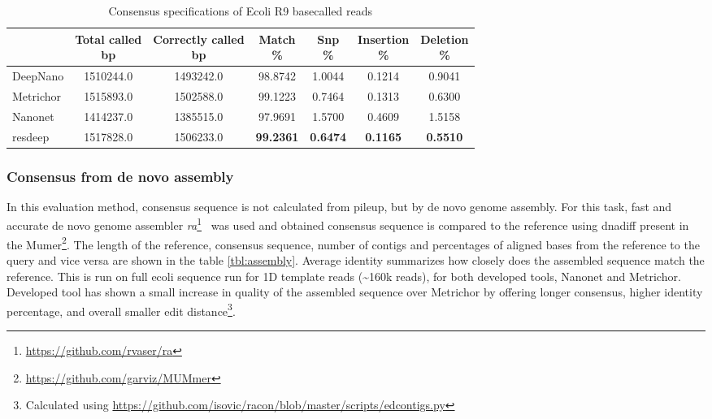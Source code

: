 \documentclass[runningheads,a4paper]{llncs}
\begin{document}
\begin{table}[]
	\caption{Consensus specifications of Ecoli R9 basecalled reads}
	\label{tbl:spec_ecoli}
	\centering
	\begin{tabular}{lcccccc}
		\toprule
		{} &  \thead{Total called\\\lbrack bp\rbrack} &  \thead{Correctly called\\\lbrack bp\rbrack} &  \thead{Match\\\%} &  \thead{Snp\\\%} &  \thead{Insertion\\\%} &  \thead{Deletion\\\%} \\
		\midrule
		DeepNano  &                  1510244.0 &                      1493242.0 &          98.8742 &         1.0044 &               0.1214 &              0.9041 \\
		Metrichor &                  1515893.0 &                      1502588.0 &          99.1223 &         0.7464 &               0.1313 &              0.6300 \\
		Nanonet   &                  1414237.0 &                      1385515.0 &          97.9691 &         1.5700 &               0.4609 &              1.5158 \\
		resdeep   &                  1517828.0 &                      1506233.0 &          \textbf{99.2361} &         \textbf{0.6474} &               \textbf{0.1165} &             \textbf{ 0.5510 }\\
		\bottomrule
	\end{tabular}
\end{table}


\subsubsection{Consensus from de novo assembly}
In this evaluation method, consensus sequence is not calculated from pileup, but by de novo genome assembly. For this task, fast and accurate de novo genome assembler \emph{ra}\footnote{\url{https://github.com/rvaser/ra}}~\cite{vaser} was used and obtained consensus sequence is compared to the reference using dnadiff present in the Mumer\footnote{\url{https://github.com/garviz/MUMmer}}.
The length of the reference, consensus sequence, number of contigs and percentages of aligned bases from the reference to the query and vice versa are shown in the table \ref{tbl:assembly}. Average identity summarizes how closely does the assembled sequence match the reference. This is run on full ecoli sequence run for 1D template reads (\textasciitilde 160k reads), for both developed tools, Nanonet and Metrichor. Developed tool has shown a small increase in quality of the assembled sequence over Metrichor by offering longer consensus, higher identity percentage, and overall smaller edit distance\footnote{Calculated using \url{https://github.com/isovic/racon/blob/master/scripts/edcontigs.py}}.
\end{document}
